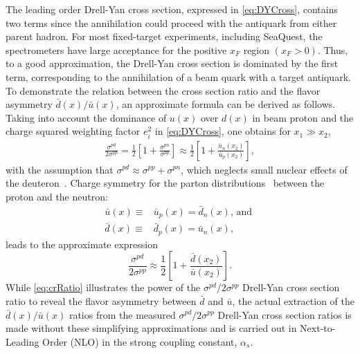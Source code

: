 \documentclass[reprint,aps,unsortedaddress,superscriptaddress,prl,floatfix,showpacs,linenumbers,final]{revtex4-2}
\begin{document}
The leading order Drell-Yan cross section, expressed in \cref{eq:DYCross},
contains two terms since the annihilation could proceed with the antiquark from either parent hadron.
For most fixed-target experiments, including SeaQuest,
the spectrometers have large acceptance for the positive $x_F$  region $\left(x_F > 0\right)$.
Thus, to a good approximation, the Drell-Yan cross section is dominated by the first term,
corresponding to the annihilation of a beam quark with a target antiquark.
To demonstrate the relation between the cross section ratio and the flavor asymmetry
$\bar{d}\left(x\right) / \bar{u}\left(x\right)$,
an approximate formula can be derived as follows.
Taking into account the dominance of $u\left(x\right)$ over $d\left(x\right)$ in
beam proton and the charge squared weighting factor $e_i^2$ in \cref{eq:DYCross}, one obtains for $x_1 \gg x_2$,
\begin{align}
	\frac{\sigma^{pd}}{2\sigma^{pp}} = \frac{1}{2}\left[1 + \frac{\sigma^{pn}}{\sigma^{pp}}\right]
	\approx \frac{1}{2}\left[1 + \frac{\bar{u}_n\left(x_2\right)}{\bar{u}_p\left(x_2\right)}\right],
\end{align}
with the assumption that $\sigma^{pd} \approx \sigma^{pp} + \sigma^{pn}$,
which neglects small nuclear effects of the deuteron~\cite{kumano1998,ehlers2014}.
Charge symmetry for the parton distributions~\cite{londergan2010} between the proton and the neutron:
\begin{equation}
	\begin{split}
		\bar u\left(x\right)  \equiv & \bar u_p\left(x\right) = \bar d_n\left(x\right)\textrm{, and } \\
		\bar d\left(x\right)  \equiv & \bar d_p\left(x\right) = \bar u_n\left(x\right),
	\end{split}
	\label{eq:chargeSymmetry}
\end{equation}
leads to the approximate expression
\begin{equation}
	\frac{\sigma^{pd}}{2\sigma^{pp}} \approx
	\frac{1}{2} \left[1+\frac{\bar d\left(x_2\right)}{\bar u\left(x_2\right)}\right].
	\label{eq:crRatio}
\end{equation}
While \cref{eq:crRatio} illustrates the power of the $\sigma^{pd}/2\sigma^{pp}$ Drell-Yan cross section
ratio to reveal the flavor asymmetry between $\bar d$ and $\bar u$,
the actual extraction of the $\bar d\left(x\right) / \bar u\left(x\right)$ ratios
from the measured $\sigma^{pd}/ 2 \sigma^{pp}$ Drell-Yan cross section ratios is
made without these simplifying approximations and is carried out in Next-to-Leading Order (NLO)
in the strong coupling constant, $\alpha_s$. %
\end{document}
